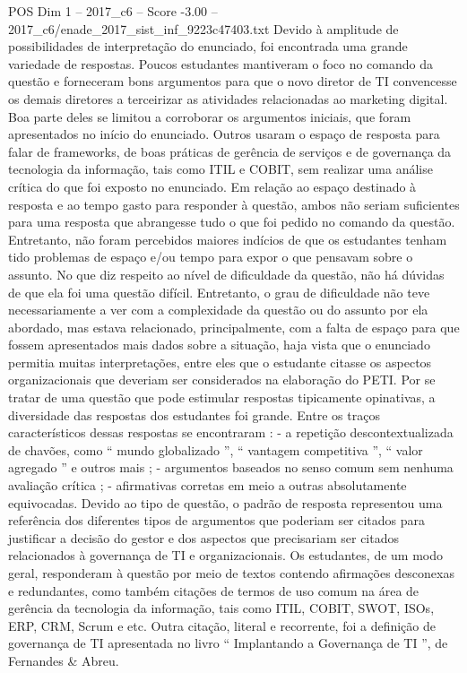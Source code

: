\begin{textsample}{POS Dim 1 – 2017\_c6 – Score -3.00 – 2017\_c6/enade\_2017\_sist\_inf\_9223c47403.txt}
Devido à amplitude de possibilidades de interpretação do enunciado, foi encontrada uma grande variedade de respostas.
Poucos estudantes mantiveram o foco no comando da questão e forneceram bons argumentos para que o novo diretor de TI convencesse os demais diretores a terceirizar as atividades relacionadas ao marketing digital.
Boa parte deles se limitou a corroborar os argumentos iniciais, que foram apresentados no início do enunciado.
Outros usaram o espaço de resposta para falar de frameworks, de boas práticas de gerência de serviços e de governança da tecnologia da informação, tais como ITIL e COBIT, sem realizar uma análise crítica do que foi exposto no enunciado.
Em relação ao espaço destinado à resposta e ao tempo gasto para responder à questão, ambos não seriam suficientes para uma resposta que abrangesse tudo o que foi pedido no comando da questão.
Entretanto, não foram percebidos maiores indícios de que os estudantes tenham tido problemas de espaço e/ou tempo para expor o que pensavam sobre o assunto.
No que diz respeito ao nível de dificuldade da questão, não há dúvidas de que ela foi uma questão difícil.
Entretanto, o grau de dificuldade não teve necessariamente a ver com a complexidade da questão ou do assunto por ela abordado, mas estava relacionado, principalmente, com a falta de espaço para que fossem apresentados mais dados sobre a situação, haja vista que o enunciado permitia muitas interpretações, entre eles que o estudante citasse os aspectos organizacionais que deveriam ser considerados na elaboração do PETI.
Por se tratar de uma questão que pode estimular respostas tipicamente opinativas, a diversidade das respostas dos estudantes foi grande.
Entre os traços característicos dessas respostas se encontraram : - a repetição descontextualizada de chavões, como “ mundo globalizado ”, “ vantagem competitiva ”, “ valor agregado ” e outros mais ; - argumentos baseados no senso comum sem nenhuma avaliação crítica ; - afirmativas corretas em meio a outras absolutamente equivocadas.
Devido ao tipo de questão, o padrão de resposta representou uma referência dos diferentes tipos de argumentos que poderiam ser citados para justificar a decisão do gestor e dos aspectos que precisariam ser citados relacionados à governança de TI e organizacionais.
Os estudantes, de um modo geral, responderam à questão por meio de textos contendo afirmações desconexas e redundantes, como também citações de termos de uso comum na área de gerência da tecnologia da informação, tais como ITIL, COBIT, SWOT, ISOs, ERP, CRM, Scrum e etc.
Outra citação, literal e recorrente, foi a definição de governança de TI apresentada no livro “ Implantando a Governança de TI ”, de Fernandes \& Abreu.

\end{textsample}
